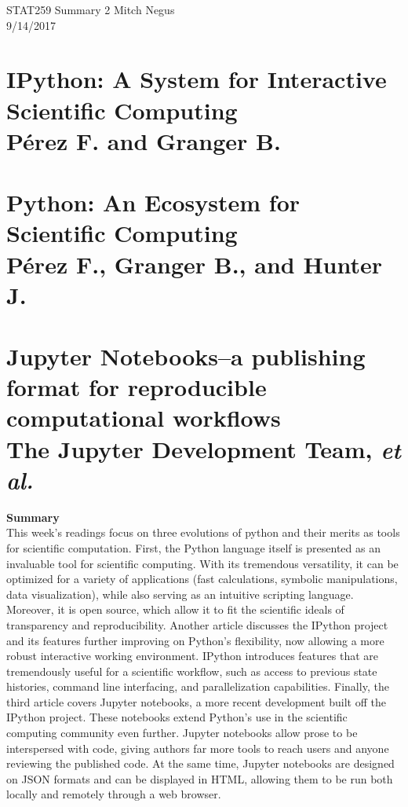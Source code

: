 \documentclass{report}
\begin{document}
\thispagestyle{empty}
\sffamily

\large {STAT259 Summary {2} \hfill Mitch Negus\\
		\hspace*{\fill} 9/14/2017\\ }
\section*{\textsf{IPython: A System for Interactive Scientific Computing \\ \normalsize P\'erez F. and Granger B.}}
\section*{\textsf{Python: An Ecosystem for Scientific Computing \\ \normalsize P\'erez F., Granger B., and Hunter J.}}
\section*{\textsf{Jupyter Notebooks--a publishing format for reproducible computational workflows \\ \normalsize The Jupyter Development Team,} \small \textit{et al.}}

\textbf{Summary}\\
This week's readings focus on three evolutions of python and their merits as tools for scientific computation. First, the Python language itself is presented as an invaluable tool for scientific computing. With its tremendous versatility, it can be optimized for a variety of applications (fast calculations, symbolic manipulations, data visualization), while also serving as an intuitive scripting language. Moreover, it is open source, which allow it to fit the scientific ideals of transparency and reproducibility. Another article discusses the IPython project and its features further improving on Python's flexibility, now allowing a more robust interactive working environment. IPython introduces features that are tremendously useful for a scientific workflow, such as access to previous state histories, command line interfacing, and parallelization capabilities. Finally, the third article covers Jupyter notebooks, a more recent development built off the IPython project. These notebooks extend Python's use in the scientific computing community even further. Jupyter notebooks allow prose to be interspersed with code, giving authors far more tools to reach users and anyone reviewing the published code. At the same time, Jupyter notebooks are designed on JSON formats and can be displayed in HTML, allowing them to be run both locally and remotely through a web browser.
\end{document}
